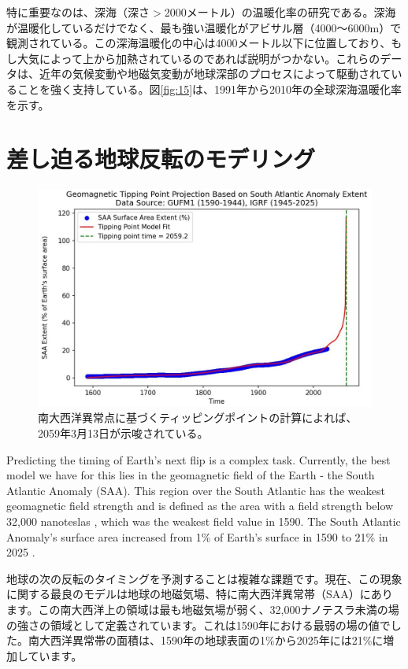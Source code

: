 \documentclass[10pt,twocolumn,letterpaper]{article}
\begin{document}
特に重要なのは、深海（深さ$>$2000メートル）の温暖化率の研究である。深海が温暖化しているだけでなく、最も強い温暖化がアビサル層（4000〜6000m）で観測されている。この深海温暖化の中心は4000メートル以下に位置しており\cite{132,129}、もし大気によって上から加熱されているのであれば説明がつかない。これらのデータは、近年の気候変動や地磁気変動が地球深部のプロセスによって駆動されていることを強く支持している。図\ref{fig:15}は、1991年から2010年の全球深海温暖化率を示す\cite{132}。

\section{差し迫る地球反転のモデリング}

\begin{figure}[b]
\begin{center}
   \includegraphics[width=1\linewidth]{saa-crop.jpeg}
\end{center}
   \caption{南大西洋異常点に基づくティッピングポイントの計算によれば、2059年3月13日が示唆されている\cite{125,126}。}
\label{fig:16}
\label{fig:onecol}
\end{figure}
Predicting the timing of Earth's next flip is a complex task. Currently, the best model we have for this lies in the geomagnetic field of the Earth - the South Atlantic Anomaly (SAA). This region over the South Atlantic has the weakest geomagnetic field strength and is defined as the area with a field strength below 32,000 nanoteslas \cite{135}, which was the weakest field value in 1590. The South Atlantic Anomaly's surface area increased from 1\% of Earth's surface in 1590 to 21\% in 2025 \cite{136}.

地球の次の反転のタイミングを予測することは複雑な課題です。現在、この現象に関する最良のモデルは地球の地磁気場、特に南大西洋異常帯（SAA）にあります。この南大西洋上の領域は最も地磁気場が弱く、32,000ナノテスラ未満の場の強さの領域として定義されています\cite{135}。これは1590年における最弱の場の値でした。南大西洋異常帯の面積は、1590年の地球表面の1\%から2025年には21\%に増加しています\cite{136}。
\end{document}
